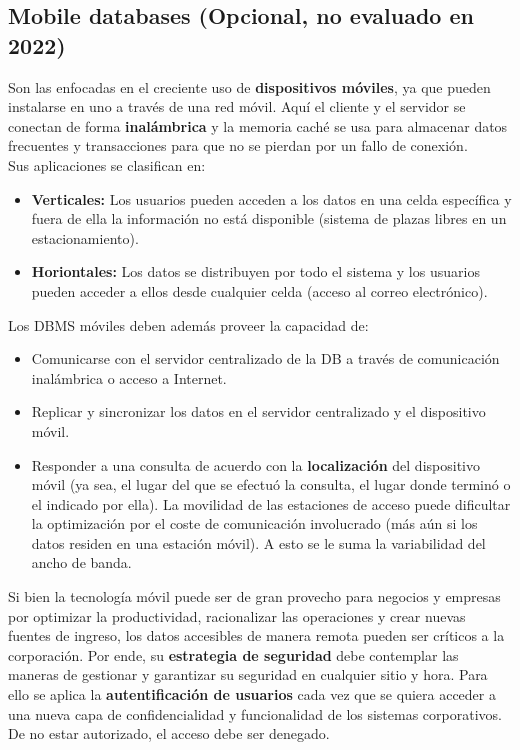 \subsection*{Mobile databases (Opcional, no evaluado en 2022)}
Son las enfocadas en el creciente uso de \textbf{dispositivos móviles}, ya que pueden instalarse en uno a través de una red móvil. Aquí el cliente y el servidor se conectan de forma \textbf{inalámbrica} y la memoria caché se usa para almacenar datos frecuentes y transacciones para que no se pierdan por un fallo de conexión. \\
Sus aplicaciones se clasifican en:
\begin{itemize}
    \item \textbf{Verticales:} Los usuarios pueden acceden a los datos en una celda específica y fuera de ella la información no está disponible (sistema de plazas libres en un estacionamiento).
    \item \textbf{Horiontales:} Los datos se distribuyen por todo el sistema y los usuarios pueden acceder a ellos desde cualquier celda (acceso al correo electrónico).
\end{itemize}
Los DBMS móviles deben además proveer la capacidad de:
\begin{itemize}
    \item Comunicarse con el servidor centralizado de la DB a través de comunicación inalámbrica o acceso a Internet.
    \item Replicar y sincronizar los datos en el servidor centralizado y el dispositivo móvil.
    \item Responder a una consulta de acuerdo con la \textbf{localización} del dispositivo móvil (ya sea, el lugar del que se efectuó la consulta, el lugar donde terminó o el indicado por ella). La movilidad de las estaciones de acceso puede dificultar la optimización por el coste de comunicación involucrado (más aún si los datos residen en una estación móvil). A esto se le suma la variabilidad del ancho de banda.
\end{itemize}
Si bien la tecnología móvil puede ser de gran provecho para negocios y empresas por optimizar la productividad, racionalizar las operaciones y crear nuevas fuentes de ingreso, los datos accesibles de manera remota pueden ser críticos a la corporación. Por ende, su \textbf{estrategia de seguridad} debe contemplar las maneras de gestionar y garantizar su seguridad en cualquier sitio y hora. Para ello se aplica la \textbf{autentificación de usuarios} cada vez que se quiera acceder a una nueva capa de confidencialidad y funcionalidad de los sistemas corporativos. De no estar autorizado, el acceso debe ser denegado.